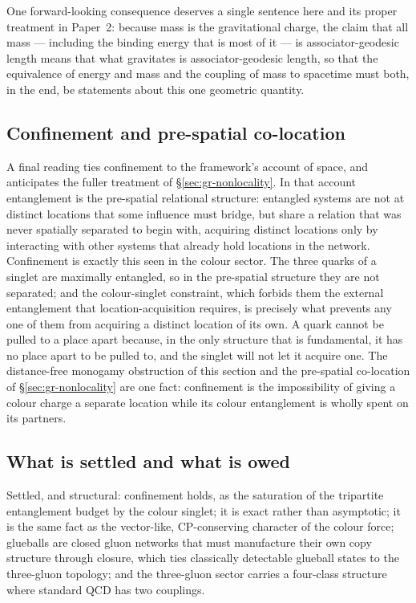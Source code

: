 One forward-looking consequence deserves a single sentence here and its proper treatment in Paper~2:
because mass is the gravitational charge, the claim that all mass --- including the binding energy that
is most of it --- is associator-geodesic length means that what gravitates is associator-geodesic
length, so that the equivalence of energy and mass and the coupling of mass to spacetime must both, in
the end, be statements about this one geometric quantity.



\subsection{Confinement and pre-spatial co-location}

A final reading ties confinement to the framework's account of space, and anticipates the fuller
treatment of \S\ref{sec:gr-nonlocality}. In that account entanglement is the pre-spatial relational
structure: entangled systems are not at distinct locations that some influence must bridge, but share
a relation that was never spatially separated to begin with, acquiring distinct locations only by
interacting with other systems that already hold locations in the network. Confinement is exactly
this seen in the colour sector. The three quarks of a singlet are maximally entangled, so in the
pre-spatial structure they are not separated; and the colour-singlet constraint, which forbids them
the external entanglement that location-acquisition requires, is precisely what prevents any one of
them from acquiring a distinct location of its own. A quark cannot be pulled to a place apart because,
in the only structure that is fundamental, it has no place apart to be pulled to, and the singlet will
not let it acquire one. The distance-free monogamy obstruction of this section and the pre-spatial
co-location of \S\ref{sec:gr-nonlocality} are one fact: confinement is the impossibility of giving a
colour charge a separate location while its colour entanglement is wholly spent on its partners.

\subsection{What is settled and what is owed}

Settled, and structural: confinement holds, as the saturation of the tripartite entanglement budget
by the colour singlet; it is exact rather than asymptotic; it is the same fact as the vector-like,
CP-conserving character of the colour force; glueballs are closed gluon networks that must manufacture
their own copy structure through closure, which ties classically detectable glueball states to the
three-gluon topology; and the three-gluon sector carries a four-class structure where standard QCD has
two couplings.

